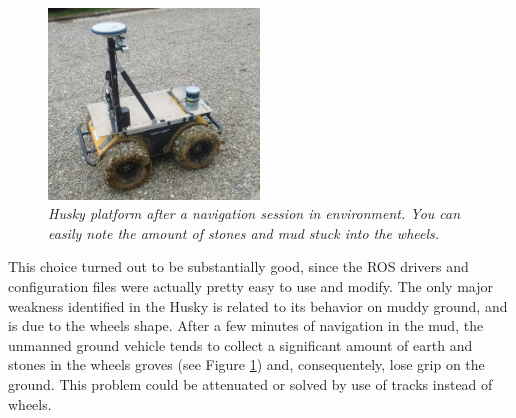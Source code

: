 \begin{figure}
	\centering
	\includegraphics[width=0.5\textwidth]{Images/grape_sw_hw_architecture/ruoteFangose.jpeg}
	\caption{\textit{Husky platform after a navigation session in environment. You can easily note the amount of stones and mud stuck into the wheels.}}
	\label{fig:ruoteFangose}
\end{figure}

This choice turned out to be substantially good, since the \ac{ROS} drivers and configuration files were actually pretty easy to use and modify. The only major weakness identified in the Husky is related to its behavior on muddy ground, and is due to the wheels shape. After a few minutes of navigation in the mud, the unmanned ground vehicle tends to collect a significant amount of earth and stones in the wheels groves (see Figure \ref{fig:ruoteFangose}) and, consequentely, lose grip on the ground. This problem could be attenuated or solved by use of tracks instead of wheels.


